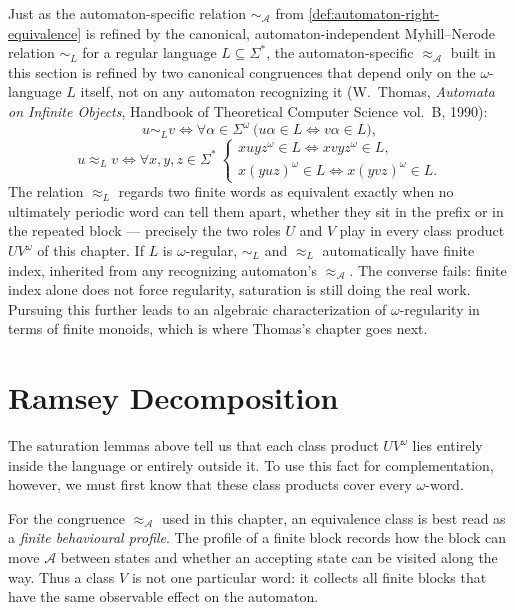 \begin{formaldetails}
Just as the automaton-specific relation $\sim_{\mathcal A}$ from
\cref{def:automaton-right-equivalence} is refined by the canonical,
automaton-independent Myhill--Nerode relation $\sim_L$ for a regular
language $L\subseteq\Sigma^*$, the automaton-specific
$\approx_{\mathcal A}$ built in this section is refined by two
canonical congruences that depend only on the $\omega$-language $L$
itself, not on any automaton recognizing it (W.~Thomas, \textit{Automata
on Infinite Objects}, Handbook of Theoretical Computer Science
vol.~B, 1990):
\[
  u\sim_L v
  \iff
  \forall\alpha\in\Sigma^\omega\
  \bigl(u\alpha\in L \Leftrightarrow v\alpha\in L\bigr),
\]
\[
  u\approx_L v
  \iff
  \forall x,y,z\in\Sigma^*\
  \begin{cases}
    xuyz^\omega\in L \Leftrightarrow xvyz^\omega\in L,\\
    x(yuz)^\omega\in L \Leftrightarrow x(yvz)^\omega\in L.
  \end{cases}
\]
The relation $\approx_L$ regards two finite words as equivalent exactly
when no ultimately periodic word can tell them apart, whether they sit
in the prefix or in the repeated block --- precisely the two roles $U$
and $V$ play in every class product $UV^\omega$ of this chapter.  If
$L$ is $\omega$-regular, $\sim_L$ and $\approx_L$ automatically have
finite index, inherited from any recognizing automaton's
$\approx_{\mathcal A}$.  The converse fails: finite index alone does
not force regularity, saturation is still doing the real work.
Pursuing this further leads to an algebraic characterization of
$\omega$-regularity in terms of finite monoids, which is where
Thomas's chapter goes next.
\end{formaldetails}


\section{Ramsey Decomposition}
\label{sec:ramsey-decomposition}

The saturation lemmas above tell us that each class product
$UV^\omega$ lies entirely inside the language or entirely outside it.
To use this fact for complementation, however, we must first know that
these class products cover every $\omega$-word.

For the congruence $\approx_{\mathcal A}$ used in this chapter, an
equivalence class is best read as a \emph{finite behavioural profile}.
The profile of a finite block records how the block can move
$\mathcal A$ between states and whether an accepting state can be
visited along the way.  Thus a class $V$ is not one particular word:
it collects all finite blocks that have the same observable effect on
the automaton.

